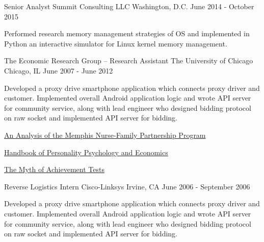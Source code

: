 \begin{cventries}

\cventry
{Senior Analyst} %
{Summit Consulting LLC} %
{Washington, D.C.} %
{June 2014 - October 2015} %
{ %
\begin{cvitems}
\item {Performed research memory management strategies of OS and implemented in Python an interactive simulator for Linux kernel memory management.}
\end{cvitems}
}


\cventry
{The Economic Research Group – Research Assistant} %
{The University of Chicago} %
{Chicago, IL} %
{June 2007 - June 2012} %
{ %
	\begin{cvitems}
		\item {Developed a proxy drive smartphone application which connects proxy driver and customer. Implemented overall Android application logic and wrote API server for community service, along with lead engineer who designed bidding protocol on raw socket and implemented API server for bidding.}
		\item {\href{https://www.nber.org/system/files/working_papers/w23610/w23610.pdf}{An Analysis of the Memphis Nurse-Family Partnership Program}}
		\item {\href{https://www.sciencedirect.com/science/article/abs/pii/B9780444534446000018}{Handbook of Personality Psychology and Economics}}
		\item {\href{https://books.google.com/books?id=gJGPAgAAQBAJ\&pg=PR15\&lpg=PR15\&dq=terrance+oey\&source=bl\&ots=LzuT7k2Cpr\&sig=ACfU3U0mT4KgGjx2B5jl0Dp77qf58JkT8Q\&hl=en\&sa=X\&ved=2ahUKEwjvpsCsvav5AhX3M1kFHYBxCI44FBDoAXoECAIQAw#v=onepage\&q=terrance\%20oey\&f=false}{The Myth of Achievement Tests}}
	\end{cvitems}
}


\cventry
{Reverse Logistics Intern} %
{Cisco-Linksys} %
{Irvine, CA} %
{June 2006 - September 2006} %
{ %
\begin{cvitems}
\item {Developed a proxy drive smartphone application which connects proxy driver and customer. Implemented overall Android application logic and wrote API server for community service, along with lead engineer who designed bidding protocol on raw socket and implemented API server for bidding.}
\end{cvitems}
}


\end{cventries}